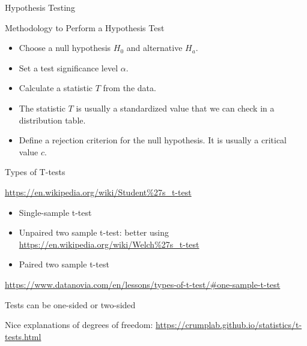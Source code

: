 \documentclass[handout]{beamer}
\begin{document}
\begin{frame}{Hypothesis Testing}
\scriptsize{

\begin{block}{Methodology to Perform a Hypothesis Test}
\begin{itemize}
 \item Choose a null hypothesis $H_0$ and alternative $H_a$.
 \item Set a test significance level $\alpha$.
 \item Calculate a statistic $T$ from the data.
 \item  The statistic $T$ is usually a standardized value that we can check in a distribution table.
 \item Define a rejection criterion for the null hypothesis. It is usually a critical value $c$.
\end{itemize}
\end{block}



} 
\end{frame}


\begin{frame}{Types of T-tests}
 \scriptsize{
\url{https://en.wikipedia.org/wiki/Student\%27s_t-test}
\begin{itemize}
 \item Single-sample t-test
 \item Unpaired two sample t-test: better using \url{https://en.wikipedia.org/wiki/Welch\%27s_t-test}
 \item Paired two sample t-test
\end{itemize}

\url{https://www.datanovia.com/en/lessons/types-of-t-test/\#one-sample-t-test}
}
Tests can be one-sided or two-sided

Nice explanations of degrees of freedom: \url{https://crumplab.github.io/statistics/t-tests.html}

\end{frame}
\end{document}
